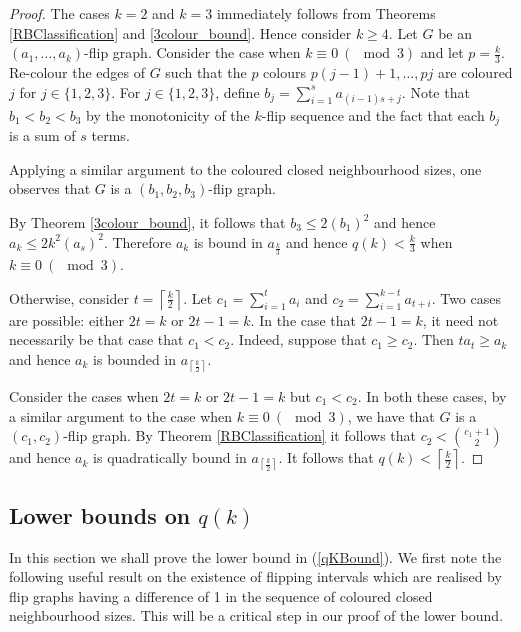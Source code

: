 \documentclass[a4paper,12pt]{article}
\begin{document}
\begin{proof}
	The cases $k = 2$ and $k = 3$ immediately follows from Theorems \ref{RBClassification} and \ref{3colour_bound}. Hence consider $k \geq 4$. Let $G$ be an $(a_1, \dots, a_k)$-flip graph. Consider the case when $k \equiv 0 \ (\!\!\!\!\mod 3)$ and let $p = \frac{k}{3}$.  Re-colour the edges of $G$ such that the $p$ colours $p(j-1) + 1, \dots, pj$ are coloured $j$ for $j \in \{1, 2, 3\}$. For $j \in \{1, 2, 3\}$, define $b_j = \sum_{i = 1}^{s} a_{(i-1)s + j}$. Note that $b_1 < b_2 < b_3$ by the monotonicity of the $k$-flip sequence and the fact that each $b_j$ is a sum of $s$ terms. 
	
	Applying a similar argument to the coloured closed neighbourhood sizes, one observes that $G$ is a $(b_1, b_2, b_3)$-flip graph.
	
	By Theorem \ref{3colour_bound}, it follows that $b_3 \leq 2 (b_1)^2$ and hence $a_k \leq 2k^2 (a_s)^2$. Therefore $a_k$ is bound in $a_{\frac{k}{3}}$ and hence $q(k) < \frac{k}{3}$ when $k \equiv 0 \ (\!\!\!\!\mod 3)$.
	
	Otherwise, consider $t = \left\lceil\frac{k}{2}\right\rceil$. Let $c_1 = \sum_{i = 1}^t a_i$ and $c_2 = \sum_{i = 1}^{k-t} a_{t+i}$. Two cases are possible: either $2t = k$ or $2t - 1 = k$. In the case that $2t - 1 = k$, it need not necessarily be that case that $c_1 < c_2$. Indeed, suppose that $c_1 \geq c_2$. Then $t a_t \geq a_k$ and hence $a_k$ is bounded in $a_{\left\lceil\frac{k}{2}\right\rceil}$.
	
	Consider the cases when $2t = k$ or $2t - 1 = k$ but $c_1 < c_2$. In both these cases, by a similar argument to the case when $k \equiv 0 \ (\!\!\!\!\mod 3)$, we have that $G$ is a $(c_1, c_2)$-flip graph. By Theorem \ref{RBClassification} it follows that $c_2 < \binom{c_1 + 1}{2}$ and hence $a_k$ is quadratically bound in $a_{\left\lceil\frac{k}{2}\right\rceil}$. It follows that $q(k) < \left\lceil\frac{k}{2}\right\rceil$.
\end{proof}

\subsection{Lower bounds on $q(k)$}

In this section we shall prove the lower bound in (\ref{qKBound}). We first note the following useful result on the existence of flipping intervals which are realised by flip graphs having a difference of 1 in the sequence of coloured closed neighbourhood sizes. This will be a critical step in our proof of the lower bound.
\end{document}
